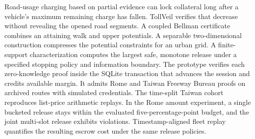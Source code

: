 Road-usage charging based on partial evidence can lock collateral long after a vehicle's maximum remaining charge has fallen. TollVeil verifies that decrease without revealing the opened road segments. A coupled Bellman certificate combines an attaining walk and upper potentials. A separable two-dimensional construction compresses the potential constraints for an urban grid. A finite-support characterization computes the largest safe, monotone release under a specified stopping policy and information boundary. The prototype verifies each zero-knowledge proof inside the SQLite transaction that advances the session and credits available margin. It admits \RomeProofs{} Rome and \TaiwanProofs{} Taiwan Freeway Bureau proofs on archived routes with simulated credentials. The time-split Taiwan cohort reproduces \TaiwanListMatches{} list-price arithmetic replays. In the Rome amount experiment, a single bucketed release stays within the evaluated five-percentage-point budget, and the joint multi-slot release exhibits \RomeMultiCapViolations{} violations. Timestamp-aligned fleet replay quantifies the resulting escrow cost under the same release policies.
